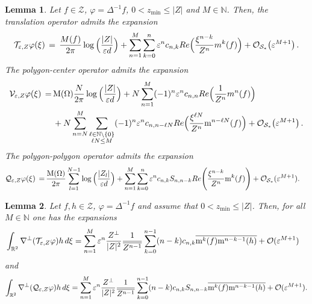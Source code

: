 \documentclass[10pt,a4paper]{amsart}
\newtheorem{lemma}{Lemma}
\def\NN {\mathbb{N}}
\def\RR {\mathbb{R}}
\def\Re{{\rm Re}}
\newcommand{\cO}{\mathcal{O}}
\newcommand{\cQ}{\mathcal{Q}}
\newcommand{\cS}{\mathcal{S}}
\newcommand{\cT}{\mathcal{T}}
\newcommand{\cV}{\mathcal{V}}
\newcommand{\cZ}{\mathcal{Z}}
\def\dd{{\rm d}}
\def\eps{\varepsilon}
\def\epsilon{\varepsilon}
\newcommand{\mrM}{\mathrm{M}}
\newcommand{\mrm}{\mathrm{m}}
\begin{document}
\begin{lemma}\label{lem:Expansions}
    Let $f \in \cZ$,  $\varphi = \Delta^{-1}f$, $0<z_{\min}\leq |Z|$ and $M\in \NN$. Then, the translation operator admits the expansion
    \begin{equation}
        \cT_{\eps,Z}\varphi(\xi) \,=\, \frac{{\rm M}(f)}{2\pi}\log\Big(\frac{|Z|}{\eps d}\Big)
    +\sum_{n=1}^M\sum_{k=0}^{n} \eps^nc_{n,k} \Re\Big(\frac{\xi^{n-k}}{Z^n}{\rm m}^k(f)\Big) + \cO_{\cS_*}\bigl(\epsilon^{M+1}\bigr)\,.
    \end{equation}
    The polygon-center operator admits the expansion
    \begin{equation}
  \begin{split}
      \cV_{\eps,Z}\varphi(\xi) \,=\,& \mrM(\Omega)\frac{N}{2\pi}\log\Big(\frac{|Z|}{\eps d}\Big)
  +N\sum_{n=1}^M (-1)^n\eps^nc_{n,n} \Re\Big(\frac{1}{Z^n}{\rm m}^n(f)\Big)\\
&+N\sum_{n=N}^M\sum_{\substack{\ell \in \mathbb{N}\setminus \{0\}\\
\ell N\leq M}}(-1)^n\eps^n c_{n,n-\ell N} \Re\Big(\frac{\xi^{\ell N}}{Z^n}\mrm^{n-\ell N}(f)\Big)+\cO_{\cS_*}\bigl(\epsilon^{M+1}\bigr)\,.
        \end{split}
\end{equation}
    The polygon-polygon operator admits the expansion
\begin{equation}
  \begin{split}
\cQ_{\eps,Z}\varphi(\xi) \,=&\, \frac{\mrM(\Omega)}{2\pi}\sum_{l=1}^{N-1}\log\Big(\frac{|Z_l|}{\eps d}\Big)
  +\sum_{n=1}^M \sum_{k=0}^n\epsilon^nc_{n,k}{\rm S}_{n,n-k}\Re\Bigg(\frac{\xi^{n-k}}{Z^n}\mrm^k(f)\Bigg)+\cO_{\cS_*}(\eps^{M+1}).
        \end{split}
\end{equation}
\end{lemma}

\begin{lemma}
\label{lem:expVel}
    Let $f,h\in \cZ$, $\varphi=\Delta^{-1}f$ and assume that $0<z_{\min}\leq |Z|$. Then, for all $M\in \mathbb{N}$ one has the expansions
    \begin{align}
\label{eq:expspeed}&\int_{\RR^2}\nabla^\perp(\cT_{\eps,Z}\varphi)h\,\dd \xi=\sum_{n=1}^M\eps^n\frac{Z^\perp}{|Z|^{2}}\frac{1}{\overline{Z^{n-1}}}\sum_{k=0}^{n-1}(n-k)c_{n,k}\overline{\mrm^k(f)}\overline{\mrm^{n-k-1}(h)}+\cO(\eps^{M+1})    \end{align}
and
\begin{equation}
    \int_{\RR^2}\nabla^\perp(\cQ_{\eps,Z}\varphi)h\,\dd \xi=\sum_{n=1}^M\eps^n\frac{Z^\perp}{|Z|^{2}}\frac{1}{\overline{Z^{n-1}}}\sum_{k=0}^{n-1}(n-k)c_{n,k}{\rm S}_{n,n-k}\overline{\mrm^k(f)}\overline{\mrm^{n-k-1}(h)}+\cO(\eps^{M+1}) .
\end{equation}
\end{lemma}
\end{document}
